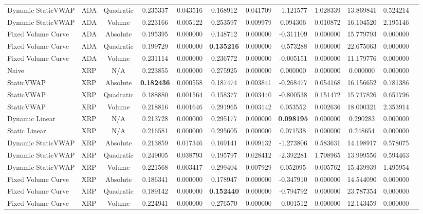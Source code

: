 \begin{table}[H]
{\begin{tabular}{llcccccccccc}
        Dynamic StaticVWAP & ADA & Quadratic & 0.235337 & 0.043516 & 0.168912 & 0.041709 & -1.121577 & 1.028339 & 13.869841 & 0.524214 \\
        Dynamic StaticVWAP & ADA & Volume & 0.223166 & 0.005122 & 0.253597 & 0.009979 & 0.094306 & 0.010872 & 16.104520 & 2.195146 \\
        Fixed Volume Curve & ADA & Absolute & 0.195395 & 0.000000 & 0.148712 & 0.000000 & -0.311109 & 0.000000 & 15.779793 & 0.000000 \\
        Fixed Volume Curve & ADA & Quadratic & 0.199729 & 0.000000 & \textbf{0.135216} & 0.000000 & -0.573288 & 0.000000 & 22.675063 & 0.000000 \\
        Fixed Volume Curve & ADA & Volume & 0.231114 & 0.000000 & 0.236772 & 0.000000 & -0.005151 & 0.000000 & 11.179776 & 0.000000 \\
        \hline
        Naive & XRP & N/A & 0.223855 & 0.000000 & 0.275925 & 0.000000 & 0.000000 & 0.000000 & 0.000000 & 0.000000 \\
        StaticVWAP & XRP & Absolute & \textbf{0.182436} & 0.000558 & 0.187474 & 0.003841 & -0.268477 & 0.054168 & 16.156652 & 0.781386 \\
        StaticVWAP & XRP & Quadratic & 0.188880 & 0.001564 & 0.158377 & 0.003440 & -0.800538 & 0.151472 & 15.717826 & 0.651796 \\
        StaticVWAP & XRP & Volume & 0.218816 & 0.001646 & 0.291965 & 0.003142 & 0.053552 & 0.002636 & 18.000321 & 2.353914 \\
        Dynamic Linear & XRP & N/A & 0.213728 & 0.000000 & 0.295177 & 0.000000 & \textbf{0.098195} & 0.000000 & 0.290283 & 0.000000 \\
        Static Linear & XRP & N/A & 0.216581 & 0.000000 & 0.295605 & 0.000000 & 0.071538 & 0.000000 & 0.248654 & 0.000000 \\
        Dynamic StaticVWAP & XRP & Absolute & 0.213859 & 0.017346 & 0.169141 & 0.009132 & -1.273806 & 0.583631 & 14.198917 & 0.578075 \\
        Dynamic StaticVWAP & XRP & Quadratic & 0.249005 & 0.038793 & 0.195797 & 0.028412 & -2.392281 & 1.708965 & 13.999556 & 0.594463 \\
        Dynamic StaticVWAP & XRP & Volume & 0.221568 & 0.003417 & 0.299404 & 0.007929 & 0.052095 & 0.005762 & 15.439939 & 1.495954 \\
        Fixed Volume Curve & XRP & Absolute & 0.186341 & 0.000000 & 0.178947 & 0.000000 & -0.347910 & 0.000000 & 14.544090 & 0.000000 \\
        Fixed Volume Curve & XRP & Quadratic & 0.189142 & 0.000000 & \textbf{0.152440} & 0.000000 & -0.794792 & 0.000000 & 23.787354 & 0.000000 \\
        Fixed Volume Curve & XRP & Volume & 0.224941 & 0.000000 & 0.276570 & 0.000000 & -0.001512 & 0.000000 & 12.143459 & 0.000000 \\
        \hline
        \end{tabular}
    }
    \label{tab:static_vwap_results}
\end{table}